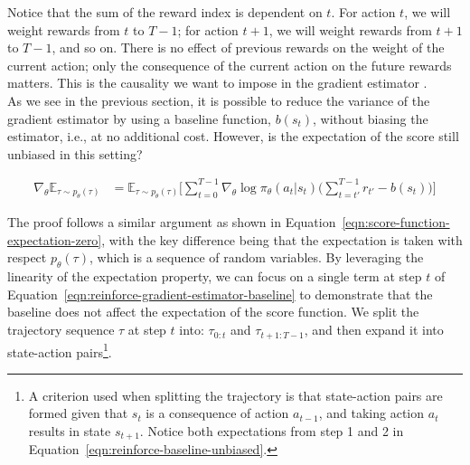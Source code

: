 \noindent Notice that the sum of the reward index is dependent on $t$. For action $t$, we  will weight rewards from $t$ to $T-1$; for action $t+1$, we will weight rewards from $t+1$ to $T-1$, and so on. There is no effect of previous rewards on the weight of the current action; only the consequence of the current action on the future rewards matters. This is the causality we want to impose in the gradient estimator . \\

\noindent As we see in the previous section, it is possible to reduce the
variance of the gradient estimator by using a baseline function, $b(s_{t})$, without biasing the estimator, i.e., at no additional cost. However, is the expectation of the score still unbiased in this setting? 

\begin{equation}\label{eqn:reinforce-gradient-estimator-baseline}
    \begin{split}
        \nabla_{\theta}\mathbb{E}_{\tau\sim p_{\theta}(\tau)} &= \mathbb{E}_{\tau\sim p_{\theta}(\tau)} \bigg[\sum_{t=0}^{T-1}\nabla_{\theta}\log\pi_{\theta}(a_{t}|s_{t}) \bigg( \sum_{t=t'}^{T-1} r_{t'}-b(s_{t}) \bigg) \bigg]
    \end{split}
\end{equation}

\noindent The proof follows a similar argument as shown in Equation~\ref{eqn:score-function-expectation-zero}, with the key difference being that the expectation is taken with respect $p_{\theta}(\tau)$, which is a sequence of random variables. By leveraging the linearity of the expectation property, we can focus on a single term at step $t$ of Equation~\ref{eqn:reinforce-gradient-estimator-baseline} to demonstrate that the baseline does not affect the expectation of the score function. We split the trajectory sequence $\tau$ at step $t$ into: $\tau_{0:t}$ and $\tau_{t+1:T-1}$, and then expand it into state-action pairs\footnote{A criterion used when splitting the trajectory is that state-action pairs are formed given that $s_{t}$ is a consequence of action $a_{t-1}$, and taking action $a_{t}$ results in state $s_{t+1}$. Notice both expectations from step 1 and 2 in Equation~\ref{eqn:reinforce-baseline-unbiased}.}.


